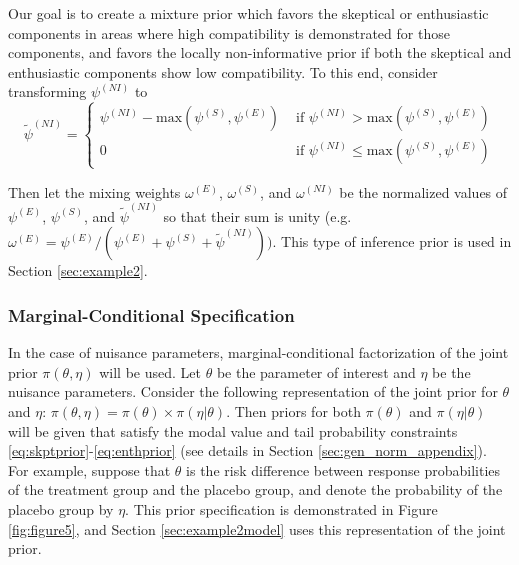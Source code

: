 \documentclass[useAMS,usenatbib,referee]{biom}
\begin{document}
Our goal is to create a mixture prior which favors the skeptical or enthusiastic components in areas where high compatibility is demonstrated for those components, and favors the locally non-informative prior if both the skeptical and enthusiastic components show low compatibility. To this end, consider transforming $\psi^{(NI)}$ to
\begin{equation}\label{eq:3partmix_ni}
\tilde{\psi}^{(NI)}=\begin{cases} 
      \psi^{(NI)}-\text{max}(\psi^{(S)},\psi^{(E)}) &\text{ if } \psi^{(NI)}>\text{max}(\psi^{(S)},\psi^{(E)})\\
      0& \text{ if } \psi^{(NI)}\leq\text{max}(\psi^{(S)},\psi^{(E)})
   \end{cases}
\end{equation}

Then let the mixing weights $\omega^{(E)}$, $\omega^{(S)}$, and $\omega^{(NI)}$ be the normalized values of $\psi^{(E)}$, $\psi^{(S)}$, and $\tilde{\psi}^{(NI)}$ so that their sum is unity (e.g. $\omega^{(E)}=\psi^{(E)}/(\psi^{(E)}+\psi^{(S)}+\tilde{\psi}^{(NI)}))$. This type of inference prior is used in Section \ref{sec:example2}.

%

\subsubsection{Marginal-Conditional Specification}\label{sec:cond_marg}
In the case of nuisance parameters, marginal-conditional factorization of the joint prior $\pi(\theta,\eta)$ will be used. Let $\theta$ be the parameter of interest and $\eta$ be the nuisance parameters. Consider the following representation of the joint prior for $\theta$ and $\eta$: $\pi(\theta,\eta)=\pi(\theta)\times\pi(\eta|\theta)$. Then priors for both $\pi(\theta)$ and $\pi(\eta|\theta)$ will be given that satisfy the modal value and tail probability constraints \eqref{eq:skptprior}-\eqref{eq:enthprior} (see details in Section \ref{sec:gen_norm_appendix}). For example, suppose that $\theta$ is the risk difference between response probabilities of the treatment group and the placebo group, and denote the  probability of the placebo group by $\eta$. This prior specification is demonstrated in Figure \ref{fig:figure5}, and Section \ref{sec:example2model} uses this representation of the joint prior.
\end{document}
